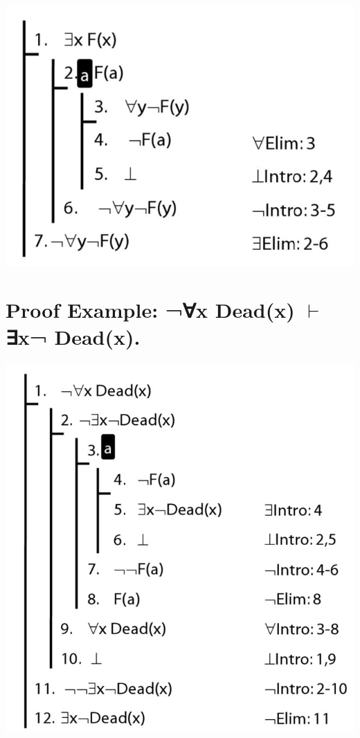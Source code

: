 \documentclass[12pt]{extarticle}
\begin{document}
\begin{multicols*}{3}
\begin{center}
\includegraphics[scale=0.3]{img/unit_825_proof.png}
\end{center}
 
 
\section{Proof Example: ¬∀x Dead(x) $\vdash$ ∃x¬ Dead(x).}
 
\begin{center}
\includegraphics[scale=0.3]{img/unit_826_proof.png}
\end{center}
\vfill
\begin{minipage}{\columnwidth}

\end{minipage}
\end{multicols*}
\end{document}
